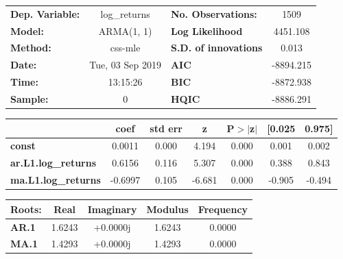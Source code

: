 \begin{center}
\begin{tabular}{lclc}
\toprule
\textbf{Dep. Variable:}     &        log\_returns       & \textbf{  No. Observations:  } &            1509            \\
\textbf{Model:}             &         ARMA(1, 1)        & \textbf{  Log Likelihood     } &          4451.108          \\
\textbf{Method:}            &          css-mle          & \textbf{  S.D. of innovations} &           0.013            \\
\textbf{Date:}              &      Tue, 03 Sep 2019     & \textbf{  AIC                } &         -8894.215          \\
\textbf{Time:}              &          13:15:26         & \textbf{  BIC                } &         -8872.938          \\
\textbf{Sample:}            &             0             & \textbf{  HQIC               } &         -8886.291          \\
\bottomrule
\end{tabular}
\vspace{1ex}
\begin{tabular}{lcccccc}
                            & \textbf{coef} & \textbf{std err} & \textbf{z} & \textbf{P$> |$z$|$} & \textbf{[0.025} & \textbf{0.975]}  \\
\midrule
\textbf{const}              &       0.0011  &        0.000     &     4.194  &         0.000        &        0.001    &        0.002     \\
\textbf{ar.L1.log\_returns} &       0.6156  &        0.116     &     5.307  &         0.000        &        0.388    &        0.843     \\
\textbf{ma.L1.log\_returns} &      -0.6997  &        0.105     &    -6.681  &         0.000        &       -0.905    &       -0.494     \\
\bottomrule
\end{tabular}
\vspace{1ex}
\begin{tabular}{lcccc}
 \textbf{Roots: }             & \textbf{            Real} & \textbf{         Imaginary} & \textbf{         Modulus} & \textbf{        Frequency}  \\
\midrule
\textbf{AR.1} &                1.6243     &                +0.0000j     &                1.6243     &                0.0000       \\
\textbf{MA.1} &                1.4293     &                +0.0000j     &                1.4293     &                0.0000       \\
\bottomrule
\end{tabular}
\end{center}
